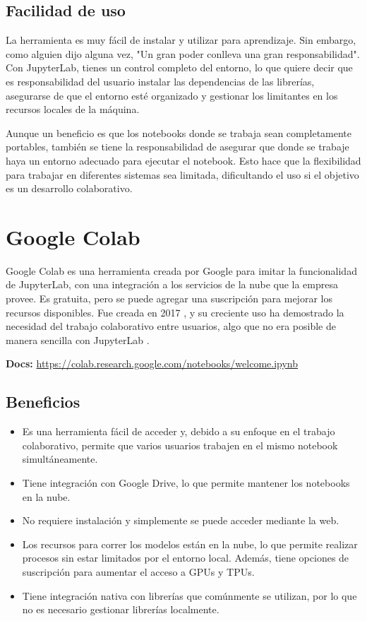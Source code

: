 \documentclass[a4paper,12pt]{article}
\begin{document}
\subsection{Facilidad de uso}
La herramienta es muy fácil de instalar y utilizar para aprendizaje. Sin embargo, como alguien dijo alguna vez, "Un gran poder conlleva una gran responsabilidad". Con JupyterLab, tienes un control completo del entorno, lo que quiere decir que es responsabilidad del usuario instalar las dependencias de las librerías, asegurarse de que el entorno esté organizado y gestionar los limitantes en los recursos locales de la máquina.\cite{perkel2018jupyter}

Aunque un beneficio es que los notebooks donde se trabaja sean completamente portables, también se tiene la responsabilidad de asegurar que donde se trabaje haya un entorno adecuado para ejecutar el notebook. Esto hace que la flexibilidad para trabajar en diferentes sistemas sea limitada, dificultando el uso si el objetivo es un desarrollo colaborativo.

\section{Google Colab}
Google Colab es una herramienta creada por Google para imitar la funcionalidad de JupyterLab, con una integración a los servicios de la nube que la empresa provee. Es gratuita, pero se puede agregar una suscripción para mejorar los recursos disponibles. Fue creada en 2017 \cite{colab_faqs}, y su creciente uso ha demostrado la necesidad del trabajo colaborativo entre usuarios, algo que no era posible de manera sencilla con JupyterLab \cite{reddit2021}.

\textbf{Docs:} \url{https://colab.research.google.com/notebooks/welcome.ipynb}\cite{google_colab_docs}

\subsection{Beneficios}
\begin{itemize}
    \item Es una herramienta fácil de acceder y, debido a su enfoque en el trabajo colaborativo, permite que varios usuarios trabajen en el mismo notebook simultáneamente.\cite{google_colab_docs}
    \item Tiene integración con Google Drive, lo que permite mantener los notebooks en la nube.\cite{colab_faqs}
    \item No requiere instalación y simplemente se puede acceder mediante la web.
    \item Los recursos para correr los modelos están en la nube, lo que permite realizar procesos sin estar limitados por el entorno local. Además, tiene opciones de suscripción para aumentar el acceso a GPUs y TPUs.
    \item Tiene integración nativa con librerías que comúnmente se utilizan, por lo que no es necesario gestionar librerías localmente.
\end{itemize}
\end{document}
